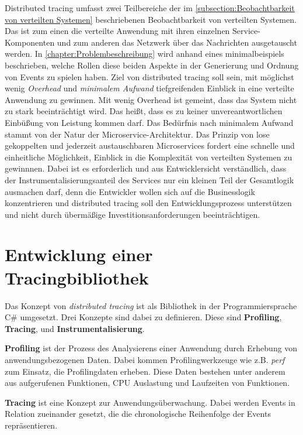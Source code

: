 Distributed tracing umfasst zwei Teilbereiche der im \cref{subsection:Beobachtbarkeit von verteilten Systemen} beschriebenen Beobachtbarkeit von verteilten Systemen. Das ist zum einen die verteilte Anwendung mit ihren einzelnen Service-Komponenten und zum anderen das Netzwerk über das Nachrichten ausgetauscht werden. In \cref{chapter:Problembeschreibung} wird anhand eines minimalbeispiels beschrieben, welche Rollen diese beiden Aspekte in der Generierung und Ordnung von Events zu spielen haben. Ziel von distributed tracing soll sein, mit möglichst wenig \emph{Overhead} und \emph{minimalem Aufwand} tiefgreifenden Einblick in eine verteilte Anwendung zu gewinnen. Mit wenig Overhead ist gemeint, dass das System nicht zu stark beeinträchtigt wird. Das heißt, dass es zu keiner unvereantwortlichen Einbüßung von Leistung kommen darf. Das Bedürfnis nach minimalem Aufwand stammt von der Natur der Microservice-Architektur. Das Prinzip von lose gekoppelten und jederzeit austauschbaren Microservices fordert eine schnelle und einheitliche  Möglichkeit, Einblick in die Komplexität von verteilten Systemen zu gewinnnen. Dabei ist es erforderlich und aus Entwicklersicht verständlich, dass der Instrumentalisierungsanteil des Services nur ein kleinen Teil der Gesamtlogik ausmachen darf, denn die Entwickler wollen sich auf die Businesslogik konzentrieren und distributed tracing soll den Entwicklungsprozess unterstützen und nicht durch übermäßige Investitionsanforderungen beeinträchtigen.

 
\section{Entwicklung einer Tracingbibliothek}
\label{subsection:Entwicklung einer Tracingbibliothek}

Das Konzept von \emph{distributed tracing} ist als Bibliothek in der Programmiersprache C\# umgesetzt. Drei Konzepte sind dabei zu definieren. Diese sind \textbf{Profiling}, \textbf{Tracing}, und \textbf{Instrumentalisierung}.  

	\textbf{Profiling} ist der Prozess des Analysierens einer Anwendung durch Erhebung von anwendungsbezogenen Daten. Dabei kommen Profilingwerkzeuge wie z.B. \emph{perf} zum Einsatz, die Profilingdaten erheben. Diese Daten bestehen unter anderem aus aufgerufenen Funktionen, CPU Auslastung und Laufzeiten von Funktionen.
	
	\textbf{Tracing} ist eine Konzept zur Anwendungsüberwachung. Dabei werden Events in Relation zueinander gesetzt, die die chronologische Reihenfolge der Events repräsentieren.
	
